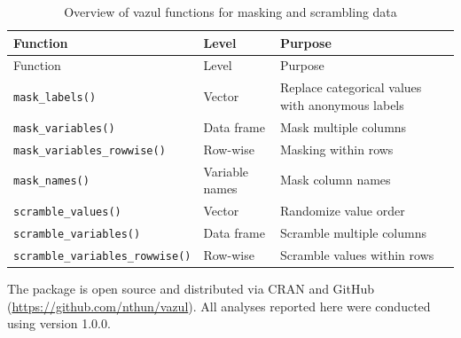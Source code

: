 \documentclass[
]{jss}
\begin{document}
\begin{longtable}[]{@{}
  >{\raggedright\arraybackslash}p{}
  >{\raggedright\arraybackslash}p{}
  >{\raggedright\arraybackslash}p{}@{}}
\caption{Overview of vazul functions for masking and scrambling
data}\tabularnewline
\toprule\noalign{}
\begin{minipage}[b]{\linewidth}\raggedright
Function
\end{minipage} & \begin{minipage}[b]{\linewidth}\raggedright
Level
\end{minipage} & \begin{minipage}[b]{\linewidth}\raggedright
Purpose
\end{minipage} \\
\midrule\noalign{}
\endfirsthead
\toprule\noalign{}
\begin{minipage}[b]{\linewidth}\raggedright
Function
\end{minipage} & \begin{minipage}[b]{\linewidth}\raggedright
Level
\end{minipage} & \begin{minipage}[b]{\linewidth}\raggedright
Purpose
\end{minipage} \\
\midrule\noalign{}
\endhead
\bottomrule\noalign{}
\endlastfoot
\texttt{mask\_labels()} & Vector & Replace categorical values with
anonymous labels \\
\texttt{mask\_variables()} & Data frame & Mask multiple columns \\
\texttt{mask\_variables\_rowwise()} & Row-wise & Masking within rows \\
\texttt{mask\_names()} & Variable names & Mask column names \\
\texttt{scramble\_values()} & Vector & Randomize value order \\
\texttt{scramble\_variables()} & Data frame & Scramble multiple
columns \\
\texttt{scramble\_variables\_rowwise()} & Row-wise & Scramble values
within rows \\
\end{longtable}

The  package is open source and distributed via CRAN and
GitHub (\url{https://github.com/nthun/vazul}). All analyses reported
here were conducted using version 1.0.0.
\end{document}
